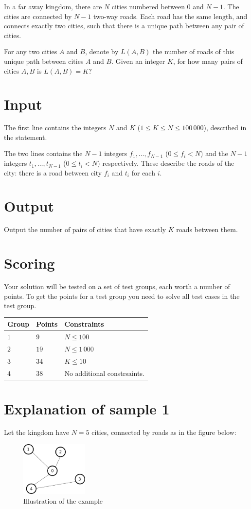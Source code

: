 In a far away kingdom, there are $N$ cities numbered between $0$ and $N - 1$.
The cities are connected by $N - 1$ two-way roads.
Each road has the same length, and connects exactly two cities, such that there is a unique path between any pair of cities.

For any two cities $A$ and $B$, denote by $L(A, B)$ the number of roads of this unique path between cities $A$ and $B$.
Given an integer $K$, for how many pairs of cities $A, B$ is $L(A, B) = K$?

\section*{Input}
The first line contains the integers $N$ and $K$ ($1 \le K \le N \le 100\,000$), described in the statement.

The two lines contains the $N - 1$ integers $f_1, \dots, f_{N-1}$ ($0 \le f_i < N$) and the $N - 1$ integers $t_1, \dots, t_{N-1}$ ($0 \le t_i < N$) respectively.
These describe the roads of the city: there is a road between city $f_i$ and $t_i$ for each $i$.

\section*{Output}
Output the number of pairs of cities that have exactly $K$ roads between them.


\section*{Scoring}
Your solution will be tested on a set of test groups, each worth a number of points.
To get the points for a test group you need to solve all test cases in the test group.

\noindent
\begin{tabular}{| l | l | l |}
  \hline
  Group & Points & Constraints \\ \hline
  $1$ & $9$ & $N \le 100$ \\ \hline
  $2$ & $19$ & $N \le 1\,000$ \\ \hline
  $3$ & $34$ & $K \le 10$ \\ \hline
  $4$ & $38$ & No additional constrsaints. \\ \hline
\end{tabular}

\section*{Explanation of sample 1}
Let the kingdom have $N = 5$ cities, connected by roads as in the figure below:
\begin{figure}[h!]
  \centering
  \includegraphics[width=0.3\textwidth]{sample.png}
  \caption{Illustration of the example}
\end{figure}

